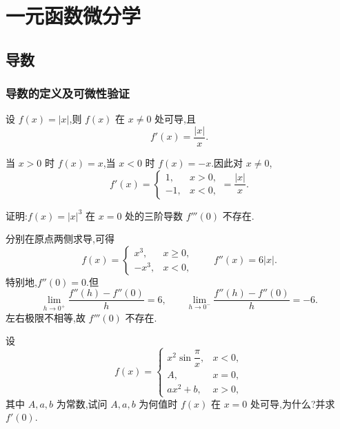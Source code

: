 \setcounter{chapter}{3}
\pagestyle{fancy}

\chapter{一元函数微分学}


\section{导数}


\subsection{导数的定义及可微性验证}

\begin{example}
    设 $f(x)=|x|$,则 $f(x)$ 在 $x\neq0$ 处可导,且
    \[
        f'(x)=\dfrac{|x|}{x}.
    \]
\end{example}
\exampleblank

\begin{solution}
    当 $x>0$ 时 $f(x)=x$,当 $x<0$ 时 $f(x)=-x$.因此对 $x\neq0$,
    \[
        f'(x)=
        \begin{cases}
            1,  & x>0, \\
            -1, & x<0,
        \end{cases}
        =\dfrac{|x|}{x}.
    \]
\end{solution}

\begin{example}
    证明:$f(x)=|x|^3$ 在 $x=0$ 处的三阶导数 $f'''(0)$ 不存在.
\end{example}
\exampleblank

\begin{solution}
    分别在原点两侧求导,可得
    \[
        f(x)=
        \begin{cases}
            x^3,  & x\geq0, \\
            -x^3, & x<0,
        \end{cases}
        \qquad
        f''(x)=6|x|.
    \]
    特别地,$f''(0)=0$.但
    \[
        \displaystyle\lim\limits_{h\to0^+}\dfrac{f''(h)-f''(0)}{h}=6,
        \qquad
        \lim\limits_{h\to0^-}\dfrac{f''(h)-f''(0)}{h}=-6.
    \]
    左右极限不相等,故 $f'''(0)$ 不存在.
\end{solution}

\begin{example}
    设
    \[
        f(x)=
        \begin{cases}
            x^2\sin\dfrac{\pi}{x}, & x<0, \\
            A,                     & x=0, \\
            ax^2+b,                & x>0,
        \end{cases}
    \]
    其中 $A,a,b$ 为常数,试问 $A,a,b$ 为何值时 $f(x)$ 在 $x=0$ 处可导,为什么?并求 $f'(0)$.
\end{example}
\exampleblank

